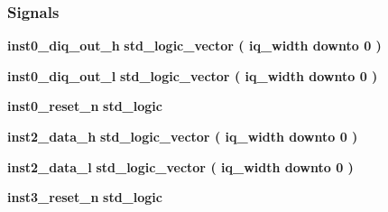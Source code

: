 \subsubsection*{Signals}
 \begin{DoxyCompactItemize}
\item 
{\bf inst0\+\_\+diq\+\_\+out\+\_\+h} {\bfseries \textcolor{comment}{std\+\_\+logic\+\_\+vector}\textcolor{vhdlchar}{ }\textcolor{vhdlchar}{(}\textcolor{vhdlchar}{ }\textcolor{vhdlchar}{ }\textcolor{vhdlchar}{ }\textcolor{vhdlchar}{ }{\bfseries {\bf iq\+\_\+width}} \textcolor{vhdlchar}{ }\textcolor{keywordflow}{downto}\textcolor{vhdlchar}{ }\textcolor{vhdlchar}{ } \textcolor{vhdldigit}{0} \textcolor{vhdlchar}{ }\textcolor{vhdlchar}{)}\textcolor{vhdlchar}{ }} 
\item 
{\bf inst0\+\_\+diq\+\_\+out\+\_\+l} {\bfseries \textcolor{comment}{std\+\_\+logic\+\_\+vector}\textcolor{vhdlchar}{ }\textcolor{vhdlchar}{(}\textcolor{vhdlchar}{ }\textcolor{vhdlchar}{ }\textcolor{vhdlchar}{ }\textcolor{vhdlchar}{ }{\bfseries {\bf iq\+\_\+width}} \textcolor{vhdlchar}{ }\textcolor{keywordflow}{downto}\textcolor{vhdlchar}{ }\textcolor{vhdlchar}{ } \textcolor{vhdldigit}{0} \textcolor{vhdlchar}{ }\textcolor{vhdlchar}{)}\textcolor{vhdlchar}{ }} 
\item 
{\bf inst0\+\_\+reset\+\_\+n} {\bfseries \textcolor{comment}{std\+\_\+logic}\textcolor{vhdlchar}{ }} 
\item 
{\bf inst2\+\_\+data\+\_\+h} {\bfseries \textcolor{comment}{std\+\_\+logic\+\_\+vector}\textcolor{vhdlchar}{ }\textcolor{vhdlchar}{(}\textcolor{vhdlchar}{ }\textcolor{vhdlchar}{ }\textcolor{vhdlchar}{ }\textcolor{vhdlchar}{ }{\bfseries {\bf iq\+\_\+width}} \textcolor{vhdlchar}{ }\textcolor{keywordflow}{downto}\textcolor{vhdlchar}{ }\textcolor{vhdlchar}{ } \textcolor{vhdldigit}{0} \textcolor{vhdlchar}{ }\textcolor{vhdlchar}{)}\textcolor{vhdlchar}{ }} 
\item 
{\bf inst2\+\_\+data\+\_\+l} {\bfseries \textcolor{comment}{std\+\_\+logic\+\_\+vector}\textcolor{vhdlchar}{ }\textcolor{vhdlchar}{(}\textcolor{vhdlchar}{ }\textcolor{vhdlchar}{ }\textcolor{vhdlchar}{ }\textcolor{vhdlchar}{ }{\bfseries {\bf iq\+\_\+width}} \textcolor{vhdlchar}{ }\textcolor{keywordflow}{downto}\textcolor{vhdlchar}{ }\textcolor{vhdlchar}{ } \textcolor{vhdldigit}{0} \textcolor{vhdlchar}{ }\textcolor{vhdlchar}{)}\textcolor{vhdlchar}{ }} 
\item 
{\bf inst3\+\_\+reset\+\_\+n} {\bfseries \textcolor{comment}{std\+\_\+logic}\textcolor{vhdlchar}{ }} 
\item 

\end{DoxyCompactItemize}
